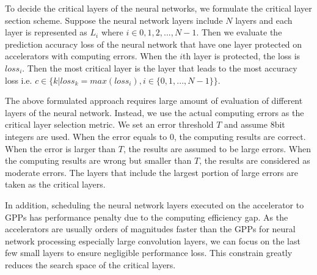To decide the critical layers of the neural networks, we formulate the 
critical layer section scheme. Suppose the neural network layers include 
$N$ layers and each layer is represented as $L_i$ where $i \in {0, 1, 2, ..., N-1}$.
Then we evaluate the prediction accuracy loss of the neural network 
that have one layer protected on accelerators with computing errors.
When the $i$th layer is protected, the loss is $loss_i$.
Then the most critical layer is the layer that leads to the most 
accuracy loss i.e. $c \in \{k|loss_k = max(loss_i), i \in \{0, 1, ..., N-1\}\}$.

The above formulated approach requires large amount of evaluation of 
different layers of the neural network. Instead, we use the actual 
computing errors as the critical layer selection metric. We set an 
error threshold $T$ and assume 8bit integers are used. 
When the error equals to 0, the computing results are correct. 
When the error is larger than $T$, the results are assumed to be large errors.
When the computing results are wrong but smaller than $T$, the results are considered 
as moderate errors. The layers that include the largest portion of large errors 
are taken as the critical layers.

In addition, scheduling the neural network layers executed 
on the accelerator to GPPs has performance penalty due to the 
computing efficiency gap. As the accelerators are usually 
orders of magnitudes faster than the GPPs for neural network 
processing especially large convolution layers, we can focus on 
the last few small layers to ensure negligible performance 
loss. This constrain greatly reduces the search space
of the critical layers. 


